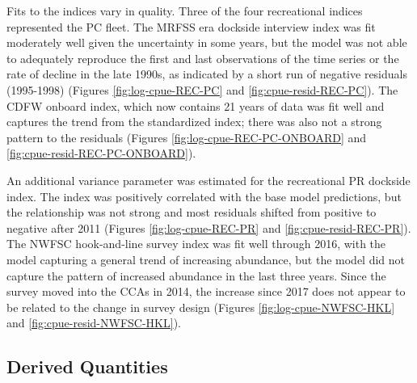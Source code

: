 \documentclass[
  english,
  a4paper,
]{article}
\begin{document}
Fits to the indices vary in quality. Three of the four recreational indices represented
the PC fleet. The MRFSS era dockside interview index was fit moderately well given the uncertainty
in some years, but the model was not able to adequately reproduce the first and last observations of the time series or the rate of decline in the late 1990s, as indicated by a short run of negative residuals (1995-1998) (Figures \ref{fig:log-cpue-REC-PC} and \ref{fig:cpue-resid-REC-PC}).
The CDFW onboard index, which now contains 21 years of data was fit well and captures the trend from
the standardized index; there was also not a strong pattern to the residuals
(Figures \ref{fig:log-cpue-REC-PC-ONBOARD} and \ref{fig:cpue-resid-REC-PC-ONBOARD}).

An additional variance parameter was estimated for the recreational PR dockside index. The index was positively correlated with the base model predictions, but the relationship was not strong and most residuals shifted from positive to negative after 2011 (Figures \ref{fig:log-cpue-REC-PR} and \ref{fig:cpue-resid-REC-PR}).
The NWFSC hook-and-line survey index was fit well through 2016, with the model capturing a general trend of increasing abundance, but the model did not capture
the pattern of increased abundance in the last three years. Since the survey moved into the CCAs in 2014, the increase since 2017 does not appear to be related to the change in survey design (Figures \ref{fig:log-cpue-NWFSC-HKL} and \ref{fig:cpue-resid-NWFSC-HKL}).

\hypertarget{derived-quantities}{%
\subsection{Derived Quantities}\label{derived-quantities}}
\end{document}

